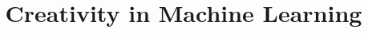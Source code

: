 \documentclass[technote,a4paper,leqno]{IEEEtran}
\title{Creativity in Machine Learning}
\author{%
    \IEEEauthorblockN{Martin Thoma}\\
    \IEEEauthorblockA{E-Mail: info@martin-thoma.de} %
}
\begin{document}
\maketitle











\printglossary


\end{document}
